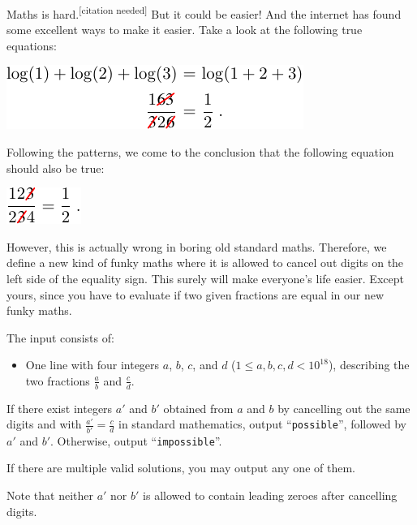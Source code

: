 
%
Maths is hard.\textsuperscript{[citation needed]}
But it could be easier!
And the internet\texttrademark{} has found some excellent ways to make it easier.
Take a look at the following true equations:
\begin{center}
    \includegraphics{fraction1.pdf}
\end{center}\vspace{-0.5\baselineskip}
Following the patterns, we come to the conclusion that the following equation should also be true:\vspace{-0.75\baselineskip}
\begin{center}
    \includegraphics{fraction2.pdf}
\end{center}\vspace{-0.5\baselineskip}
However, this is actually wrong in boring old standard maths.
Therefore, we define a new kind of funky maths where it is allowed to cancel out digits on the left side of the equality sign.
This surely will make everyone's life easier.
Except yours, since you have to evaluate if two given fractions are equal in our new funky maths.

\begin{Input}
The input consists of:
\begin{itemize}
\item One line with four integers $a$, $b$, $c$, and $d$ ($1\leq a,b,c,d<10^{18}$), describing the two fractions $\frac{a}{b}$ and $\frac{c}{d}$.
\end{itemize}
\end{Input}

\begin{Output}
If there exist integers $a'$ and $b'$ obtained from $a$ and $b$ by cancelling
out the same digits and with $\frac{a'}{b'} = \frac{c}{d}$ in standard mathematics, output
``\texttt{possible}'', followed by $a'$ and $b'$.
Otherwise, output ``\texttt{impossible}''.

If there are multiple valid solutions, you may output any one of them.

Note that neither $a'$ nor $b'$ is allowed to contain leading zeroes after
cancelling digits.
\end{Output}
